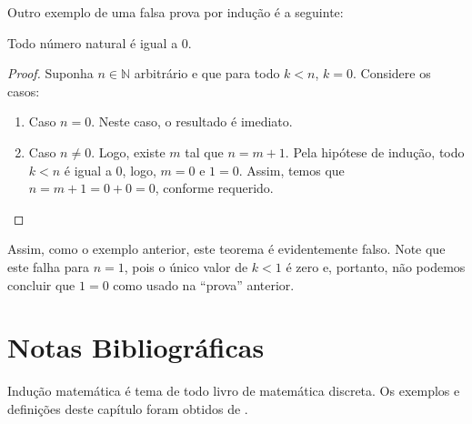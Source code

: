 Outro exemplo de uma falsa prova por indução é a seguinte:

\begin{Theorem}
Todo número natural é igual a $0$.
\end{Theorem}
\begin{proof}
Suponha $n\in\mathbb{N}$ arbitrário e que para todo $k < n$, $k =
0$. Considere os casos:
\begin{enumerate}
  \item[\ ] Caso $n = 0$. Neste caso, o resultado é imediato.
  \item[\ ] Caso $n \neq 0$. Logo, existe $m$ tal que $n = m +
    1$. Pela hipótese de indução, todo $k < n$ é igual a $0$, logo, $m
    = 0$ e $1 = 0$. Assim, temos que $n = m + 1 = 0 + 0 = 0$, conforme requerido.
\end{enumerate}
\end{proof}
Assim, como o exemplo anterior, este teorema é evidentemente
falso. Note que este falha para $n = 1$, pois o único valor de $k < 1$
é zero e, portanto, não podemos concluir que $1 = 0$ como usado na
``prova'' anterior.

\section{Notas Bibliográficas}

Indução matemática é tema de todo livro de matemática discreta. Os
exemplos e definições deste capítulo foram obtidos de \cite{Velleman06}.